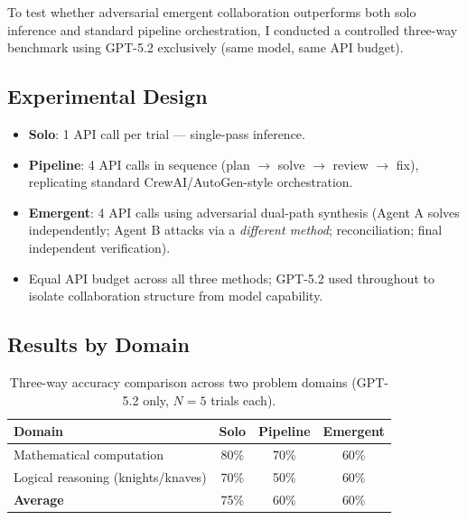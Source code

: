 \documentclass[12pt]{article}
\begin{document}
To test whether adversarial emergent collaboration outperforms both solo
inference and standard pipeline orchestration, I conducted a controlled
three-way benchmark using GPT-5.2 exclusively (same model, same API budget).

\subsection*{Experimental Design}

\begin{itemize}
  \item \textbf{Solo}: 1 API call per trial — single-pass inference.
  \item \textbf{Pipeline}: 4 API calls in sequence (plan $\to$ solve $\to$ review $\to$ fix),
        replicating standard CrewAI/AutoGen-style orchestration.
  \item \textbf{Emergent}: 4 API calls using adversarial dual-path synthesis
        (Agent A solves independently; Agent B attacks via a \emph{different method};
        reconciliation; final independent verification).
  \item Equal API budget across all three methods; GPT-5.2 used throughout to
        isolate collaboration structure from model capability.
\end{itemize}

\subsection*{Results by Domain}

\begin{table}[h]
\centering
\caption{Three-way accuracy comparison across two problem domains (GPT-5.2 only, $N=5$ trials each).}
\label{tab:amplification}
\begin{tabular}{lccc}
\hline
\textbf{Domain} & \textbf{Solo} & \textbf{Pipeline} & \textbf{Emergent} \\
\hline
Mathematical computation & 80\% & 70\% & 60\% \\
Logical reasoning (knights/knaves) & 70\% & 50\% & 60\% \\
\hline
\textbf{Average} & 75\% & 60\% & 60\% \\
\hline
\end{tabular}
\end{table}
\end{document}
